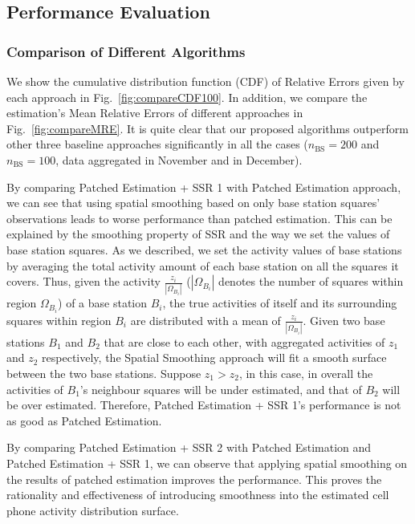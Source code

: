 \subsection{Performance Evaluation}
\subsubsection{\bf Comparison of Different Algorithms}


We show the cumulative distribution function (CDF) of Relative Errors given by each approach in Fig.~\ref{fig:compareCDF100}. In addition, we compare the estimation's Mean Relative Errors of different approaches in Fig.~\ref{fig:compareMRE}. It is quite clear that our proposed algorithms outperform other three baseline approaches significantly in all the cases ($n_{\text{BS}} = 200$ and $n_{\text{BS}}=100$, data aggregated in November and in December). 

By comparing Patched Estimation + SSR 1 with Patched Estimation approach, we can see that using spatial smoothing based on only base station squares' observations leads to worse performance than patched estimation. This can be explained by the smoothing property of SSR and the way we set the values of base station squares. As we described, we set the activity values of base stations by averaging the total activity amount of each base station on all the squares it covers. Thus, given the activity $\frac{z_i}{|\Omega_{B_i}|}$ ($|\Omega_{B_i}|$ denotes the number of squares within region $\Omega_{B_i}$) of a base station $B_i$, the true activities of itself and its surrounding squares within region $B_i$ are distributed with a mean of $\frac{z_i}{|\Omega_{B_i}|}$. Given two base stations $B_1$ and $B_2$ that are close to each other, with aggregated activities of $z_1$ and $z_2$ respectively, the Spatial Smoothing approach will fit a smooth surface between the two base stations. Suppose $z_1 > z_2$, in this case, in overall the activities of $B_1$'s neighbour squares will be under estimated, and that of $B_2$ will be over estimated. Therefore, Patched Estimation + SSR 1's performance is not as good as Patched Estimation.

By comparing Patched Estimation + SSR 2 with Patched Estimation and Patched Estimation + SSR 1, we can observe that applying spatial smoothing on the results of patched estimation improves the performance. This proves the rationality and effectiveness of introducing smoothness into the estimated cell phone activity distribution surface.

